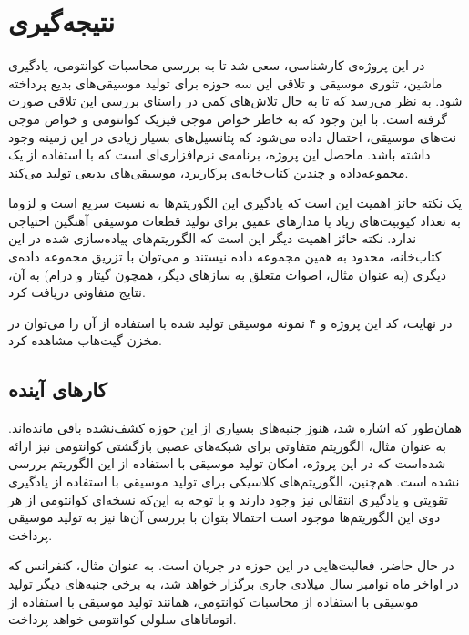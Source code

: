 \chapter{نتیجه‌گیری}

در این پروژه‌ی کارشناسی، سعی شد تا به بررسی محاسبات کوانتومی، یادگیری ماشین، تئوری موسیقی و تلاقی این سه حوزه برای تولید موسیقی‌های بدیع پرداخته شود. به نظر می‌رسد که تا به حال تلاش‌های کمی در راستای بررسی این تلاقی صورت گرفته است. با این وجود که به خاطر خواص موجی فیزیک کوانتومی و خواص موجی نت‌های موسیقی، احتمال داده می‌شود که پتانسیل‌های بسیار زیادی در این زمینه وجود داشته باشد.
ماحصل این پروژه، برنامه‌ی نرم‌افزاری‌ای است که با استفاده از یک مجموعه‌داده و چندین کتاب‌خانه‌ی پرکاربرد، موسیقی‌های بدیعی تولید می‌کند.

یک نکته حائز اهمیت این است که یادگیری این الگوریتم‌ها به نسبت سریع است و لزوما به تعداد کیوبیت‌های زیاد یا مدارهای عمیق برای تولید قطعات موسیقی آهنگین احتیاجی ندارد.
نکته حائز اهمیت دیگر این است که الگوریتم‌های پیاده‌سازی شده در این کتاب‌خانه، محدود به همین مجموعه داده نیستند و می‌توان با تزریق مجموعه داده‌ی دیگری (به عنوان مثال، اصوات متعلق به سازهای دیگر، همچون گیتار و درام) به آن، نتایج متفاوتی دریافت کرد.

در نهایت، کد این پروژه و ۴ نمونه موسیقی تولید شده با استفاده از آن را می‌توان در مخزن گیت‌هاب
\cite{Maqenta}
مشاهده کرد.

\section{کارهای آینده}
همان‌طور که اشاره شد، هنوز جنبه‌های بسیاری از این حوزه کشف‌نشده باقی مانده‌اند. به عنوان مثال، الگوریتم متفاوتی
\cite{bausch2020recurrent}
برای شبکه‌های عصبی بازگشتی کوانتومی نیز ارائه شده‌است که در این پروژه، امکان تولید موسیقی با استفاده از این الگوریتم بررسی نشده است. هم‌چنین، الگوریتم‌های کلاسیکی برای تولید موسیقی با استفاده از یادگیری تقویتی و یادگیری انتقالی نیز وجود دارند و با توجه به این‌که نسخه‌ای کوانتومی از هر دوی این الگوریتم‌ها موجود است
\cite{Mari_qtransfer}
\cite{Daoyi_QReinforce}
احتمالا بتوان با بررسی آن‌ها نیز به تولید موسیقی پرداخت.

در حال حاضر، فعالیت‌هایی در این حوزه در جریان است. به عنوان مثال، کنفرانس
\cite{ISQCMC}
که در اواخر ماه نوامبر سال میلادی جاری برگزار خواهد شد، به برخی جنبه‌های دیگر تولید موسیقی با استفاده از محاسبات کوانتومی، همانند
تولید موسیقی با استفاده از اتوماتاهای سلولی کوانتومی خواهد پرداخت.
